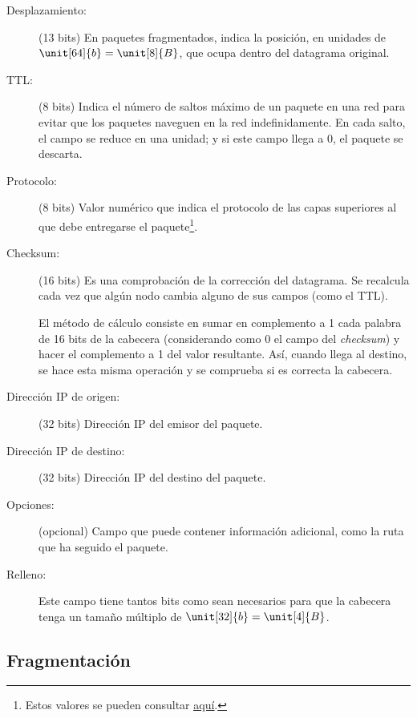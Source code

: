 \begin{description}
    \item[Desplazamiento:] (13 bits) En paquetes fragmentados, indica la posición, en unidades de $\unit[64]{b}=\unit[8]{B}$, que ocupa dentro del datagrama original.
    
    \item[\acrfull{TTL}:] (8 bits) Indica el número de saltos máximo de un paquete en una red para evitar que los paquetes naveguen en la red indefinidamente. En cada salto, el campo se reduce en una unidad; y si este campo llega a 0, el paquete se descarta.
    
    \item[Protocolo:] (8 bits) Valor numérico que indica el protocolo de las capas superiores al que debe entregarse el paquete\footnote{Estos valores se pueden consultar \href{https://www.iana.org/assignments/protocol-numbers/protocol-numbers.xhtml}{\ul{aquí}}.}.
    
    \item[Checksum:] (16 bits) Es una comprobación de la corrección del datagrama. Se recalcula cada vez que algún nodo cambia alguno de sus campos (como el \acrshort{TTL}).
    
    El método de cálculo consiste en sumar en complemento a 1 cada palabra de 16 bits de la cabecera (considerando como $0$ el campo del \textit{checksum}) y hacer el complemento a 1 del valor resultante. Así, cuando llega al destino, se hace esta misma operación y se comprueba si es correcta la cabecera.

    \item[Dirección IP de origen:] (32 bits) Dirección IP del emisor del paquete.
    
    \item[Dirección IP de destino:] (32 bits) Dirección IP del destino del paquete.
    
    \item[Opciones:] (opcional) Campo que puede contener información adicional, como la ruta que ha seguido el paquete.
    
    \item[Relleno:] Este campo tiene tantos bits como sean necesarios para que la cabecera tenga un tamaño múltiplo de $\unit[32]{b}=\unit[4]{B}$.
\end{description}

\subsection{Fragmentación}

